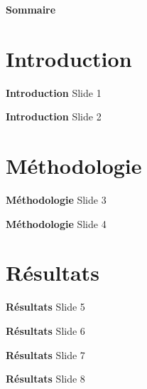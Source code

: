 \documentclass[aspectratio=169,10pt]{beamer}
\title[Titre court]{\titre}
\subtitle{\soustitre}
\author{\auteur}
\institute{\institut}
\date{\today}
\begin{document}
\begin{frame}
    \titlepage
\end{frame}

\begin{frame}{\textbf{Sommaire}}
    \tableofcontents
\end{frame}

\section{Introduction}

\begin{frame}{\textbf{Introduction}}
    Slide 1
\end{frame}

\begin{frame}{\textbf{Introduction}}
    Slide 2
\end{frame}

\section{Méthodologie}

\begin{frame}{\textbf{Méthodologie}}
    Slide 3
\end{frame}

\begin{frame}{\textbf{Méthodologie}}
    Slide 4
\end{frame}

\section{Résultats}

\begin{frame}{\textbf{Résultats}}
    Slide 5
\end{frame}

\begin{frame}{\textbf{Résultats}}
    Slide 6
\end{frame}

\begin{frame}{\textbf{Résultats}}
    Slide 7
\end{frame}

\begin{frame}{\textbf{Résultats}}
    Slide 8
\end{frame}
\end{document}
